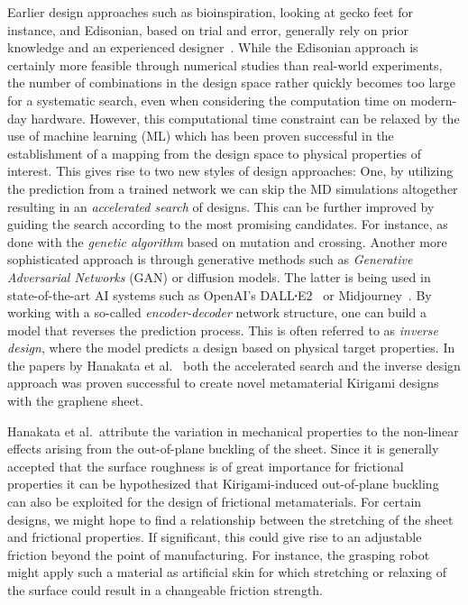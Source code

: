 Earlier design approaches such as bioinspiration, looking at gecko
feet for instance, and Edisonian, based on trial and error, generally rely on
prior knowledge and an experienced designer~\cite{Mao}. While the Edisonian approach is certainly more feasible through numerical studies than real-world
experiments, the number of combinations in the design space rather quickly
becomes too large for a systematic search, even when considering the computation
time on modern-day hardware. However, this computational time constraint can be
relaxed by the use of machine learning (\acrshort{ML}) which has been proven 
successful in the establishment of a mapping from the design space to physical
properties of interest. This gives rise to two new styles of design approaches:
One, by utilizing the prediction from a trained network we can skip the
\acrshort{MD} simulations altogether resulting in an \textit{accelerated search}
of designs. This can be further improved by guiding the search according to
the most promising candidates. For instance, as done with the \textit{genetic
algorithm} based on mutation and crossing. Another
more sophisticated approach is through generative methods such as
\textit{Generative Adversarial Networks} (\acrshort{GAN}) or diffusion models.
The latter is being used in state-of-the-art AI systems such as OpenAI's
DALL$\sq$E2~\cite{DALLE} or Midjourney~\cite{Midjourney}. By working with a
so-called \textit{encoder-decoder} network structure, one can build a model that
reverses the prediction process. This is often referred to as \textit{inverse
design}, where the model predicts a design based on physical target
properties. In the papers by Hanakata et al.~\cite{PhysRevLett.121.255304,
PhysRevResearch.2.042006} both the accelerated search and the inverse design approach was proven successful to create novel
metamaterial Kirigami designs with the graphene sheet. 

Hanakata et al.\ attribute the variation in mechanical properties to the
non-linear effects arising from the out-of-plane buckling of the sheet. Since it
is generally accepted that the surface roughness is of great importance for
frictional properties it can be hypothesized that Kirigami-induced out-of-plane
buckling can also be exploited for the design of frictional metamaterials. For
certain designs, we might hope to find a relationship between the stretching of
the sheet and frictional properties. If significant, this could give rise to an
adjustable friction beyond the point of manufacturing. For instance,
the grasping robot might apply such a material as artificial skin for which
stretching or relaxing of the surface could result in a changeable friction
strength.


